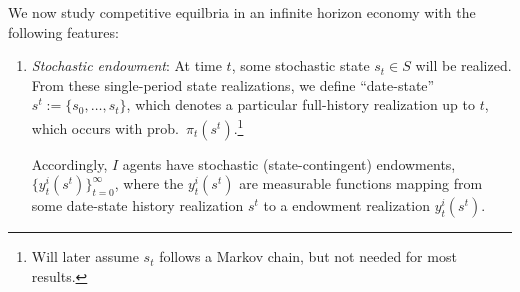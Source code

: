 \documentclass[12pt]{article}
\theoremstyle{plain}
\theoremstyle{definition}
\theoremstyle{remark}
\newcommand{\tinfz}{^\infty_{t=0}}
\begin{document}
We now study competitive equilbria in an infinite horizon economy with
the following features:
\begin{enumerate}
  \item \emph{Stochastic endowment}:
    At time $t$, some stochastic state $s_t\in S$ will be realized.
    From these single-period state realizations, we define
    ``date-state'' $s^t:=\{s_0,\ldots,s_t\}$, which denotes a particular
    full-history realization up to $t$, which occurs with
    prob.\ $\pi_t(s^t)$.\footnote{%
      Will later assume $s_t$ follows a Markov chain, but not needed for
      most results.
    }

    Accordingly, $I$ agents have stochastic (state-contingent)
    endowments, $\{y^i_t(s^t)\}\tinfz$, where the $y_t^i(s^t)$ are
    measurable functions mapping from some date-state history
    realization $s^t$ to a endowment realization $y_t^i(s^t)$.



\end{enumerate}
\end{document}
